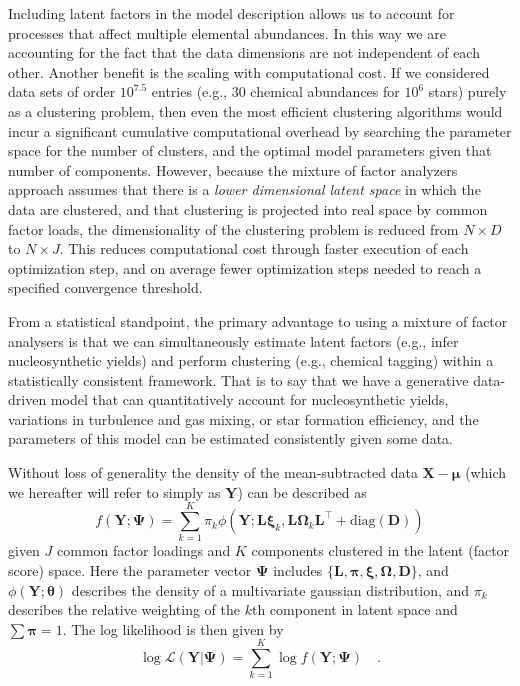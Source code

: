 \documentclass[twocolumn]{aastex62}
\newcommand{\vect}[1]{\boldsymbol{\mathbf{#1}}}
\renewcommand{\vec}[1]{\vect{#1}}
\newcommand{\weight}{\pi}
\newcommand{\data}{\textbf{Y}}
\newcommand{\vecdata}{\vec\data}
\newcommand{\vecdataunscaled}{\vec{X}}
\newcommand{\diag}[1]{\textrm{diag}(#1)}
\newcommand{\transpose}{^\intercal}
\newcommand{\eye}{\textbf{I}}
\newcommand{\factorloads}{\textbf{L}}
\newcommand{\specificvariance}{\vec{D}}
\newcommand{\scoremeans}{\vec\xi}
\newcommand{\scorecovs}{\vec\Omega}
\newcommand{\NumLatentFactors}{J}
\newcommand{\NumComponents}{K}
\newcommand{\numcomponents}{k}
\begin{document}
Including latent factors in the model description allows us to account for 
processes that affect multiple elemental abundances. In this way we are 
accounting for the fact that the data dimensions are not independent of
each other. Another benefit is the scaling with computational cost. If we 
considered data sets of order $10^{7.5}$
entries (e.g., 30 chemical abundances for $10^6$ stars) purely as a
clustering problem, then even the most efficient clustering
algorithms would incur a significant cumulative computational 
overhead by searching the parameter space for the number of
clusters, and the optimal model parameters given that number
of components. However, because the mixture of factor analyzers
approach assumes that there is a \emph{lower dimensional latent 
space} in which the data are clustered, and that clustering is 
projected into real space by common factor loads, the 
dimensionality of the clustering problem is reduced from 
$N \times D$ to $N \times J$. This reduces computational cost through
faster execution of each optimization step, and on average fewer optimization steps
needed to reach a specified convergence threshold.

From a statistical standpoint, the primary advantage to using
a mixture of factor analysers is that we can simultaneously
estimate latent factors (e.g., infer nucleosynthetic 
yields) and perform clustering (e.g., chemical tagging) 
within a statistically consistent framework. That is to say
that we have a generative data-driven model that can 
quantitatively account for nucleosynthetic yields, variations in
turbulence and gas mixing, or star formation efficiency,
and the parameters of this model can be estimated consistently
given some data.

Without loss of generality the density of the mean-subtracted 
data $\vecdataunscaled - \vec\mu$ (which we hereafter will refer to simply as $\vecdata$) can be described as
\begin{equation}
	f(\vecdata; \vec\Psi) = \sum_{\numcomponents=1}^{\NumComponents}\weight_\numcomponents\phi(\vecdata;\factorloads\scoremeans_\numcomponents, \factorloads\scorecovs_\numcomponents\factorloads\transpose + \diag{\specificvariance})
\end{equation}
\noindent{}given $\NumLatentFactors$ common factor loadings and $\NumComponents$ components
clustered in the latent (factor score) space. Here the parameter
vector
$\vec\Psi$ includes $\{\factorloads,\vec\pi,\scoremeans,\scorecovs,\specificvariance\}$, and $\phi(\vecdata; \vec\theta)$
describes the density of a multivariate gaussian distribution,
and $\weight_\numcomponents$ describes the relative weighting of the $\numcomponents$th
component in latent space and $\sum\vec\weight = 1$.
The log likelihood is then given by
\begin{equation}
	\log\mathcal{L}(\vecdata|\vec\Psi) = \sum_{\numcomponents=1}^{\NumComponents}\log{f(\vecdata;\vec\Psi)} \quad . \label{eq:log-likelihood}
\end{equation}
\end{document}
